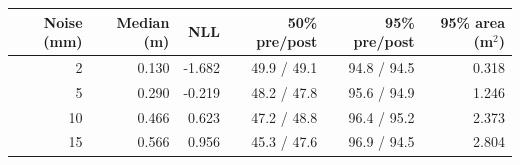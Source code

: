 \begin{tabular}{rrrrrr}
\toprule
Noise (mm) & Median (m) & NLL & 50\% pre/post & 95\% pre/post & 95\% area (m$^2$) \\
\midrule
2 & 0.130 & -1.682 & 49.9 / 49.1 & 94.8 / 94.5 & 0.318 \\
5 & 0.290 & -0.219 & 48.2 / 47.8 & 95.6 / 94.9 & 1.246 \\
10 & 0.466 & 0.623 & 47.2 / 48.8 & 96.4 / 95.2 & 2.373 \\
15 & 0.566 & 0.956 & 45.3 / 47.6 & 96.9 / 94.5 & 2.804 \\
\bottomrule
\end{tabular}
